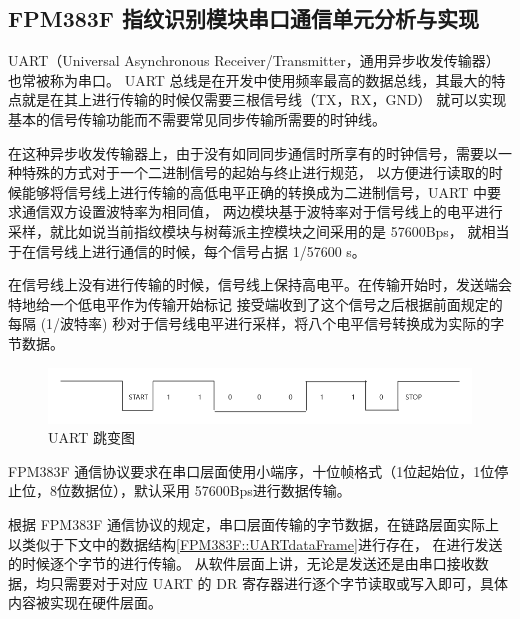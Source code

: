 

    \subsection{FPM383F 指纹识别模块串口通信单元分析与实现}

    UART（Universal Asynchronous Receiver/Transmitter，通用异步收发传输器）也常被称为串口。
    UART 总线是在开发中使用频率最高的数据总线，其最大的特点就是在其上进行传输的时候仅需要三根信号线（TX，RX，GND）
    就可以实现基本的信号传输功能而不需要常见同步传输所需要的时钟线。

    在这种异步收发传输器上，由于没有如同同步通信时所享有的时钟信号，需要以一种特殊的方式对于一个二进制信号的起始与终止进行规范，
    以方便进行读取的时候能够将信号线上进行传输的高低电平正确的转换成为二进制信号，UART 中要求通信双方设置波特率为相同值，
    两边模块基于波特率对于信号线上的电平进行采样，就比如说当前指纹模块与树莓派主控模块之间采用的是 57600Bps，
    就相当于在信号线上进行通信的时候，每个信号占据 1/57600 s。

    在信号线上没有进行传输的时候，信号线上保持高电平。在传输开始时，发送端会特地给一个低电平作为传输开始标记
    接受端收到了这个信号之后根据前面规定的每隔 (1/波特率) 秒对于信号线电平进行采样，将八个电平信号转换成为实际的字节数据。

    \begin{figure}[ht]
        \centering
        \includegraphics[scale=0.4]{imgs/UART跳变图.png}
        \caption{UART 跳变图}    \label{fig::uart}
    \end{figure}

    FPM383F 通信协议要求在串口层面使用小端序，十位帧格式（1位起始位，1位停止位，8位数据位），默认采用 57600Bps进行数据传输。
    \cite{noauthor_fpm383c_nodate}

    根据 FPM383F 通信协议的规定，串口层面传输的字节数据，在链路层面实际上以类似于下文中的数据结构\ref{FPM383F::UARTdataFrame}进行存在，
    在进行发送的时候逐个字节的进行传输。\cite{fpm383c-modular-communication-protocol}
    从软件层面上讲，无论是发送还是由串口接收数据，均只需要对于对应 UART 的 DR 寄存器进行逐个字节读取或写入即可，具体内容被实现在硬件层面。
    
